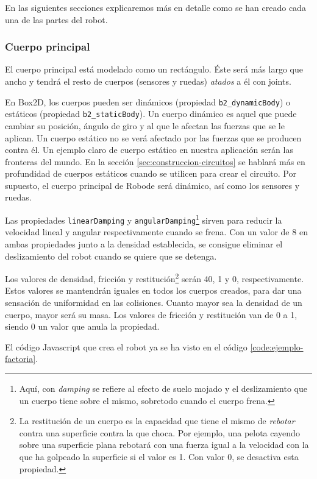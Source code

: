En las siguientes secciones explicaremos más en detalle como se han creado cada una de las partes del robot.
 
\subsubsection*{Cuerpo principal}
\label{sec:cuerpo-principal}

El cuerpo principal está modelado como un rectángulo. Éste será más largo que ancho y tendrá el resto de cuerpos (sensores y ruedas) \emph{atados} a él con joints. 

En Box2D, los cuerpos pueden ser dinámicos (propiedad \texttt{b2\_dynamicBody}) o estáticos (propiedad \texttt{b2\_staticBody}). Un cuerpo dinámico es aquel que puede cambiar su posición, ángulo de giro y al que le afectan las fuerzas que se le aplican. Un cuerpo estático no se verá afectado por las fuerzas que se producen contra él. Un ejemplo claro de cuerpo estático en nuestra aplicación serán las fronteras del mundo. En la sección \ref{sec:construccion-circuitos} se hablará más en profundidad de cuerpos estáticos cuando se utilicen para crear el circuito. Por supuesto, el cuerpo principal de Robode será dinámico, así como los sensores y ruedas.

Las propiedades \texttt{linearDamping} y \texttt{angularDamping}\footnote{Aquí, con \emph{damping} se refiere al efecto de suelo mojado y el deslizamiento que un cuerpo tiene sobre el mismo, sobretodo cuando el cuerpo frena.} sirven para reducir la velocidad lineal y angular respectivamente cuando se frena. Con un valor de 8 en ambas propiedades junto a la densidad establecida, se consigue eliminar el deslizamiento del robot cuando se quiere que se detenga.
 
Los valores de densidad, fricción y restitución\footnote{La restitución de un cuerpo es la capacidad que tiene el mismo de \emph{rebotar} contra una superficie contra la que choca. Por ejemplo, una pelota cayendo sobre una superficie plana rebotará con una fuerza igual a la velocidad con la que ha golpeado la superficie si el valor es 1. Con valor 0, se desactiva esta propiedad.} serán 40, 1 y 0, respectivamente. Estos valores se mantendrán iguales en todos los cuerpos creados, para dar una sensación de uniformidad en las colisiones. Cuanto mayor sea la densidad de un cuerpo, mayor será su masa. Los valores de fricción y restitución van de 0 a 1, siendo 0 un valor que anula la propiedad. 
 
El código Javascript que crea el robot ya se ha visto en el código \ref{code:ejemplo-factoria}. 


